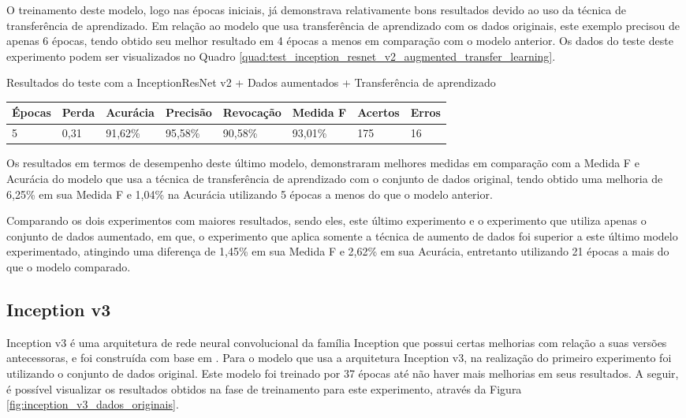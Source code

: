 \documentclass[
	12pt,				%
	oneside,			%
	a4paper,			%
	english,			%
	brazil				%
	]{abntex2ppgsi}
\begin{document}
O treinamento deste modelo, logo nas épocas iniciais, já demonstrava relativamente bons resultados devido ao uso da técnica de transferência de aprendizado. Em relação ao modelo que usa transferência de aprendizado com os dados originais, este exemplo precisou de apenas 6 épocas, tendo obtido seu melhor resultado em 4 épocas a menos em comparação com o modelo anterior. Os dados do teste deste experimento podem ser visualizados no Quadro \ref{quad:test_inception_resnet_v2_augmented_transfer_learning}.

\begin{quadro}[H]
\caption{Resultados do teste com a InceptionResNet v2 + Dados aumentados + Transferência de aprendizado}
\label{quad:test_inception_resnet_v2_augmented_transfer_learning}
\centering
\begin{tabular}{|l|l|l|l|l|l|l|l|}
\cline{1-8}
Épocas & Perda & Acurácia & Precisão & Revocação & Medida F & Acertos & Erros \\ \hline
5 & 0,31 & 91,62\% & 95,58\% & 90,58\% & 93,01\% & 175 & 16 \\
\cline{1-8}
\end{tabular}
\end{quadro}

Os resultados em termos de desempenho deste último modelo, demonstraram melhores medidas em comparação com a Medida F e Acurácia do modelo que usa a técnica de transferência de aprendizado com o conjunto de dados original, tendo obtido uma melhoria de 6,25\% em sua Medida F e 1,04\% na Acurácia utilizando 5 épocas a menos do que o modelo anterior. 

Comparando os dois experimentos com maiores resultados, sendo eles, este último experimento e o experimento que utiliza apenas o conjunto de dados aumentado, em que, o experimento que aplica somente a técnica de aumento de dados foi superior a este último modelo experimentado, atingindo uma diferença de 1,45\% em sua Medida F e 2,62\% em sua Acurácia, entretanto utilizando 21 épocas a mais do que o modelo comparado.

\subsection{Inception v3}
Inception v3 é uma arquitetura de rede neural convolucional da família Inception que possui certas melhorias com relação a suas versões antecessoras, e foi construída com base em . Para o modelo que usa a arquitetura Inception v3, na realização do primeiro experimento foi utilizando o conjunto de dados original. Este modelo foi treinado por 37 épocas até não haver mais melhorias em seus resultados. A seguir, é possível visualizar os resultados obtidos na fase de treinamento para este experimento, através da Figura \ref{fig:inception_v3_dados_originais}.
\end{document}
